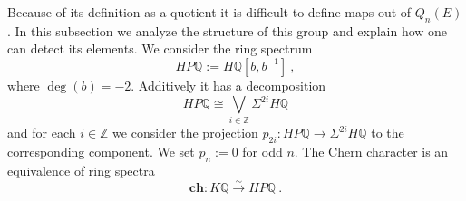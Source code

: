 \documentclass[12pt]{article}
\newtheorem{ass}[theorem]{Assumption}
\newcommand{\hA}{{\mathbf{\hat A}}}
\newcommand{\nat}{{\mathbb{N}}}
\newcommand{\Z}{{\mathbb{Z}}}
\newcommand{\Q}{{\mathbb{Q}}}
\newcommand{\R}{{\mathbb{R}}}
\newcommand{\Td}{{\mathbf{Td}}}
\newcommand{\ch}{{\mathbf{ch}}}
\begin{document}

Because of its definition as a quotient it is difficult to define maps out of  $Q_{n}(E)$. In this subsection we analyze the structure of this group and explain how one can detect its elements.
We consider the ring spectrum
$$HP\Q:=H\Q[b,b^{-1}]\ ,$$
where $\deg(b)=-2$. Additively it has a decomposition 
\begin{equation}\label{eq8560}HP\Q\cong \bigvee_{i\in \Z}  \Sigma^{2i}H\Q\end{equation} and   for each $i\in \Z$ we consider the projection $p_{2i}:HP\Q\to \Sigma^{2i}H\Q$ to the corresponding component. We set $p_{n}:=0$ for odd $n$. 
The Chern character is an equivalence of ring spectra  $$\ch:K\Q\stackrel{\sim}{\to} HP\Q\ .$$
\end{document}
